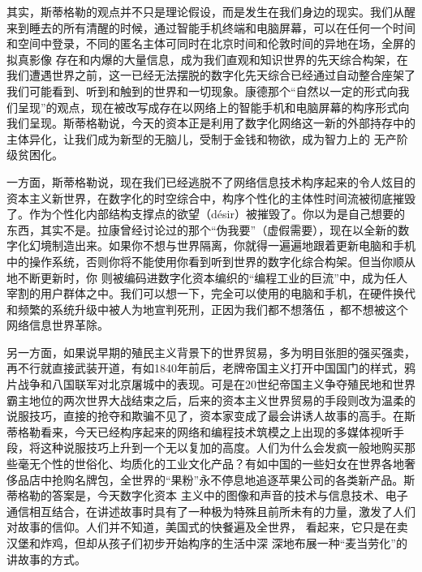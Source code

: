 \documentclass{article}
\begin{document}
其实，斯蒂格勒的观点并不只是理论假设，而是发生在我们身边的现实。我们从醒来到睡去的所有清醒的时候，通过智能手机终端和电脑屏幕，可以在任何一个时间和空间中登录，不同的匿名主体可同时在北京时间和伦敦时间的异地在场，全屏的拟真影像
\newpage
存在和内爆的大量信息，成为我们直观和知识世界的先天综合构架，在我们遭遇世界之前，这一已经无法摆脱的数字化先天综合已经通过自动整合座架了我们可能看到、听到和触到的世界和一切现象。康德那个“自然以一定的形式向我们呈现”的观点，现在被改写成存在以网络上的智能手机和电脑屏幕的构序形式向我们呈现。斯蒂格勒说，今天的资本正是利用了数字化网络这一新的外部持存中的主体异化，让我们成为新型的无脑儿，受制于金钱和物欲，成为智力上的
无产阶级贫困化。 

一方面，斯蒂格勒说，现在我们已经逃脱不了网络信息技术构序起来的令人炫目的资本主义新世界，在数字化的时空综合中，构序个性化的主体性时间流被彻底摧毁了。作为个性化内部结构支撑点的欲望（désir）被摧毁了。你以为是自己想要的东西，其实不是。拉康曾经讨论过的那个“伪我要”（虚假需要），现在以全新的数字化幻境制造出来。如果你不想与世界隔离，你就得一遍遍地跟着更新电脑和手机中的操作系统，否则你将不能使用你看到听到世界的数字化综合构架。但当你顺从地不断更新时，你
\newpage
则被编码进数字化资本编织的“编程工业的巨流”中，成为任人宰割的用户群体之中。我们可以想一下，完全可以使用的电脑和手机，在硬件换代和频繁的系统升级中被人为地宣判死刑，正因为我们都不想落伍
，都不想被这个网络信息世界革除。 

另一方面，如果说早期的殖民主义背景下的世界贸易，多为明目张胆的强买强卖，再不行就直接武装开道，有如1840年前后，老牌帝国主义打开中国国门的样式，鸦片战争和八国联军对北京屠城中的表现。可是在20世纪帝国主义争夺殖民地和世界霸主地位的两次世界大战结束之后，后来的资本主义世界贸易的手段则改为温柔的说服技巧，直接的抢夺和欺骗不见了，资本家变成了最会讲诱人故事的高手。在斯蒂格勒看来，今天已经构序起来的网络和编程技术筑模之上出现的多媒体视听手段，将这种说服技巧上升到一个无以复加的高度。人们为什么会发疯一般地购买那些毫无个性的世俗化、均质化的工业文化产品？有如中国的一些妇女在世界各地奢侈品店中抢购名牌包，全世界的“果粉”永不停息地追逐苹果公司的各类新产品。斯蒂格勒的答案是，今天数字化资本
\newpage
主义中的图像和声音的技术与信息技术、电子通信相互结合，在讲述故事时具有了一种极为特殊且前所未有的力量，激发了人们对故事的信仰。人们并不知道，美国式的快餐遍及全世界， 看起来，它只是在卖汉堡和炸鸡，但却从孩子们初步开始构序的生活中深
深地布展一种“麦当劳化”的讲故事的方式。 
\end{document}
